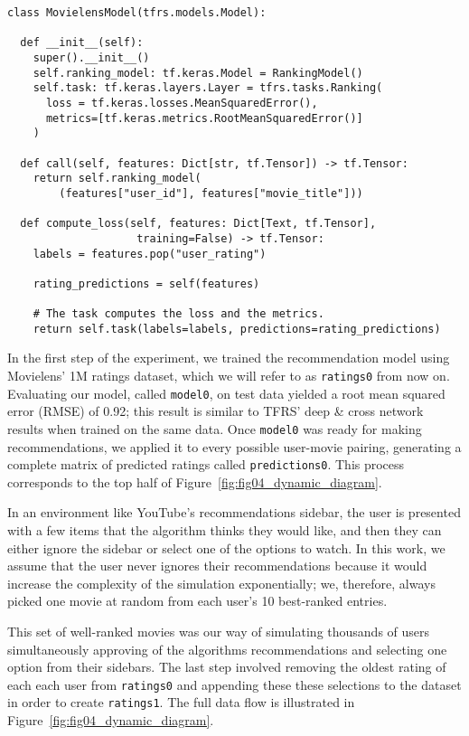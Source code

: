 \begin{verbatim}
class MovielensModel(tfrs.models.Model):

  def __init__(self):
    super().__init__()
    self.ranking_model: tf.keras.Model = RankingModel()
    self.task: tf.keras.layers.Layer = tfrs.tasks.Ranking(
      loss = tf.keras.losses.MeanSquaredError(),
      metrics=[tf.keras.metrics.RootMeanSquaredError()]
    )

  def call(self, features: Dict[str, tf.Tensor]) -> tf.Tensor:
    return self.ranking_model(
        (features["user_id"], features["movie_title"]))

  def compute_loss(self, features: Dict[Text, tf.Tensor],
                    training=False) -> tf.Tensor:
    labels = features.pop("user_rating")

    rating_predictions = self(features)

    # The task computes the loss and the metrics.
    return self.task(labels=labels, predictions=rating_predictions)
\end{verbatim}

In the first step of the experiment, we trained the recommendation model using
Movielens' 1M ratings dataset, which we will refer to as \verb|ratings0| from
now on. Evaluating our model, called \verb|model0|, on test data yielded a root
mean squared error (RMSE) of 0.92; this result is similar to TFRS' deep \& cross
network \citep{wang_deep_2017} results when trained on the same data. Once
\verb|model0| was ready for making recommendations, we applied it to every
possible user-movie pairing, generating a complete matrix of predicted ratings
called \verb|predictions0|. This process corresponds to the top half of
Figure~\ref{fig:fig04_dynamic_diagram}.

In an environment like YouTube's recommendations sidebar, the user is presented
with a few items that the algorithm thinks they would like, and then they can
either ignore the sidebar or select one of the options to watch. In this work,
we assume that the user never ignores their recommendations because it would
increase the complexity of the simulation exponentially; we, therefore, always
picked one movie at random from each user's 10 best-ranked entries.

This set of well-ranked movies was our way of simulating thousands of users
simultaneously approving of the algorithms recommendations and selecting one
option from their sidebars. The last step involved removing the oldest rating of
each each user from \verb|ratings0| and appending these these selections to the
dataset in order to create \verb|ratings1|. The full data flow is illustrated
in Figure~\ref{fig:fig04_dynamic_diagram}.

